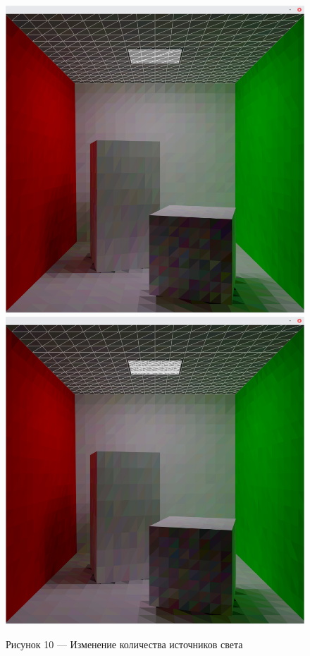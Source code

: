 \documentclass[12pt]{article}
\begin{document}
\begin{figure}[h]
\centering
\includegraphics[scale=0.3]{no_tess.png}
\includegraphics[scale=0.3]{tess.png}
\caption*{Рисунок 10 --- Изменение количества источников света}
\end{figure}
\end{document}
